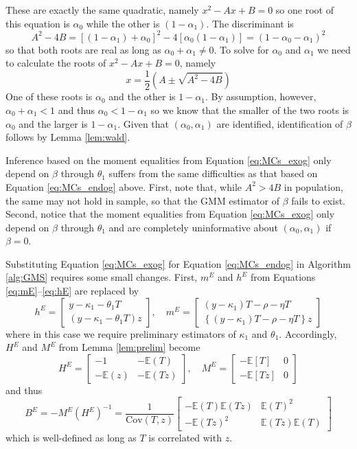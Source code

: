 These are exactly the same quadratic, namely $x^2 - Ax + B = 0$ so one root of this equation is $\alpha_0$ while the other is $(1 - \alpha_1)$.
The discriminant is
\[
  A^2 - 4 B = \left[ (1 - \alpha_1) + \alpha_0 \right]^2 - 4\left[ \alpha_0 (1 - \alpha_1) \right] = (1 - \alpha_0 - \alpha_1)^2
\]
so that both roots are real as long as $\alpha_0 + \alpha_1 \neq 0$.
To solve for $\alpha_0$ and $\alpha_1$ we need to calculate the roots of $x^2 - Ax + B =0$, namely
\[
  x = \frac{1}{2}\left( A \pm \sqrt{A^2 - 4B} \right)
\]
One of these roots is $\alpha_0$ and the other is $1 - \alpha_1$.
By assumption, however, $\alpha_0 + \alpha_1 < 1$ and thus $\alpha_0 < 1 - \alpha_1$ so we know that the smaller of the two roots is $\alpha_0$ and the larger is $1 - \alpha_1$.
Given that $(\alpha_0, \alpha_1)$ are identified, identification of $\beta$ follows by Lemma \ref{lem:wald}.

Inference based on the moment equalities from Equation \ref{eq:MCs_exog} only depend on $\beta$ through $\theta_1$ suffers from the same difficulties as that based on Equation \ref{eq:MCs_endog} above.
First, note that, while $A^2 > 4B$ in population, the same may not hold in sample, so that the GMM estimator of $\beta$ fails to exist.
Second, notice that the moment equalities from Equation \ref{eq:MCs_exog} only depend on $\beta$ through $\theta_1$ and are completely uninformative about $(\alpha_0, \alpha_1)$ if $\beta = 0$.

Substituting Equation \ref{eq:MCs_exog} for Equation \ref{eq:MCs_endog} in Algorithm \ref{alg:GMS} requires some small changes.
First, $m^E$ and $h^E$ from Equations \ref{eq:mE}--\ref{eq:hE} are replaced by 
\[
 h^E = \left[
 \begin{array}{c}
   y - \kappa_1 - \theta_1 T \\
   (y - \kappa_1 - \theta_1 T) z
 \end{array}
 \right], \quad
  m^E = \left[
  \begin{array}{c}
    (y - \kappa_1)T - \rho - \eta T\\
    \left\{(y - \kappa_1)T - \rho - \eta T\right\}z
  \end{array}
\right]
\]
where in this case we require preliminary estimators of $\kappa_1$ and $\theta_1$.
Accordingly, $H^E$ and $M^E$ from Lemma \ref{lem:prelim} become
\[
  H^E = \left[
\begin{array}{cc}
  -1 & -\mathbb{E}(T)\\
  -\mathbb{E}(z) & -\mathbb{E}(Tz)
\end{array}
\right], \quad
  M^E = \left[
\begin{array}{cc}
  -\mathbb{E}[T] & 0 \\
  -\mathbb{E}[Tz] & 0
\end{array}
\right]
\]
and thus
\[
  B^E = -M^E (H^E)^{-1} = 
\frac{1}{\mbox{Cov}(T,z)} \left[
\begin{array}{cc}
  -\mathbb{E}(T)\mathbb{E}(Tz) & \mathbb{E}(T)^2 \\
  -\mathbb{E}(Tz)^2 & \mathbb{E}(Tz) \mathbb{E}(T)
\end{array}
\right]
\]
which is well-defined as long as $T$ is correlated with $z$.


